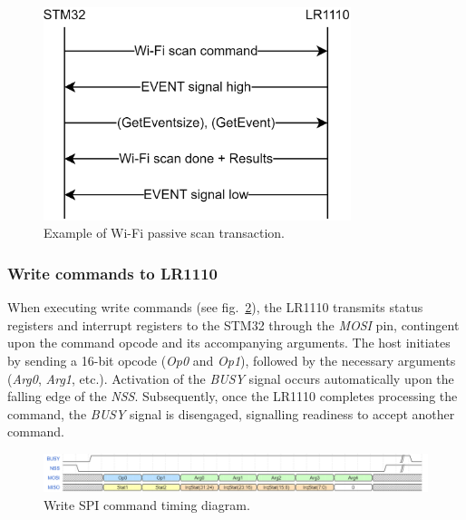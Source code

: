 
\begin{figure}[H]
    \centering
    \includegraphics[width=0.8\textwidth]{figures/event_example.png}
    \caption{Example of Wi-Fi passive scan transaction.}
    \label{fig:event_example}
\end{figure}


\subsubsection{Write commands to LR1110}
When executing write commands (see fig.~\ref{fig:write_command}), the LR1110 transmits status registers and interrupt registers to the STM32 through the \textit{MOSI} pin, contingent upon the command opcode and its accompanying arguments. The host initiates by sending a 16-bit opcode (\textit{Op0} and \textit{Op1}), followed by the necessary arguments (\textit{Arg0}, \textit{Arg1}, etc.). Activation of the \textit{BUSY} signal occurs automatically upon the falling edge of the \textit{NSS}. Subsequently, once the LR1110 completes processing the command, the \textit{BUSY} signal is disengaged, signalling readiness to accept another command.

\begin{figure}[H]
    \centering
    \includegraphics[width=1\textwidth]{figures/write_command.png}
    \caption{Write SPI command timing diagram.}
    \label{fig:write_command}
\end{figure}

